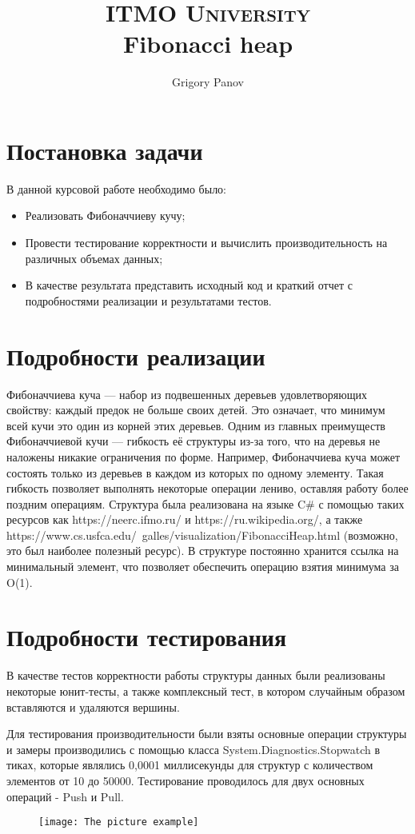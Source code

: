 \documentclass[article, a4paper]{llncs}
\title{
		\usefont{OT1}{bch}{b}{n}
		\normalfont \normalsize \textsc{ITMO University} \\ [25pt]
		\huge Fibonacci heap \\
}
\author{
		\normalfont 								
		\normalsize
        Grigory Panov\\[-5pt]		
        \normalsize
}
\institute{
\today
}
\date{}
\newcommand{\Csh}{C{\lserif\#}}
\begin{document}
\maketitle
    \section{Постановка задачи}
    В данной курсовой работе необходимо было:
    \begin{itemize}
        \item Реализовать Фибоначчиеву кучу;
        \item Провести тестирование корректности и вычислить производительность на различных объемах данных;
        \item В качестве результата представить исходный код и краткий отчет с подробностями реализации и
        результатами тестов.
    \end{itemize}
    
    \section{Подробности реализации}
    Фибоначчиева куча — набор из подвешенных деревьев удовлетворяющих свойству: каждый предок не больше своих детей. Это означает, что минимум всей кучи это один из корней этих деревьев. Одним из главных преимуществ Фибоначчиевой кучи — гибкость её структуры из-за того, что на деревья не наложены никакие ограничения по форме. Например, Фибоначчиева куча может состоять только из деревьев в каждом из которых по одному элементу. Такая гибкость позволяет выполнять некоторые операции лениво, оставляя работу более поздним операциям. Структура была реализована на языке \Csh{} с помощью таких ресурсов как https://neerc.ifmo.ru/ и https://ru.wikipedia.org/, а также https://www.cs.usfca.edu/~galles/visualization/FibonacciHeap.html (возможно, это был наиболее полезный ресурс). В структуре постоянно хранится ссылка на минимальный элемент, что позволяет обеспечить операцию взятия минимума за O(1). 
    \section{Подробности тестирования}
    В качестве тестов корректности работы структуры данных были реализованы некоторые юнит-тесты, а также комплексный тест, в котором случайным образом вставляются и удаляются вершины.
    
    Для тестирования производительности были взяты основные операции структуры и замеры производились с помощью класса System.Diagnostics.Stopwatch в тиках, которые являлись 0,0001 миллисекунды для структур с количеством элементов от 10 до 50000. 
    Тестирование проводилось для двух основных операций - Push и Pull. 
    \begin{figure}[h]
        \texttt{[image: The picture example]}
        \centering
    \end{figure}
    
\end{document}
